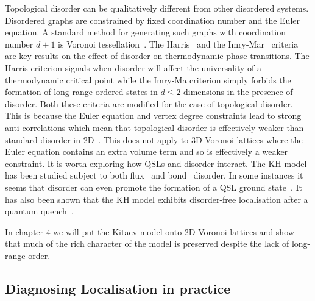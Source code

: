 Topological disorder can be qualitatively different from other disordered systems. Disordered graphs are constrained by fixed coordination number and the Euler equation. A standard method for generating such graphs with coordination number \(d+1\) is Voronoi tessellation~\autocite{mitchellAmorphousTopologicalInsulators2018,marsalTopologicalWeaireThorpeModels2020}. The Harris~\autocite{harrisEffectRandomDefects1974} and the Imry-Mar~\autocite{imryRandomFieldInstabilityOrdered1975} criteria are key results on the effect of disorder on thermodynamic phase transitions. The Harris criterion signals when disorder will affect the universality of a thermodynamic critical point while the Imry-Ma criterion simply forbids the formation of long-range ordered states in \(d \leq 2\) dimensions in the presence of disorder. Both these criteria are modified for the case of topological disorder. This is because the Euler equation and vertex degree constraints lead to strong anti-correlations which mean that topological disorder is effectively weaker than standard disorder in 2D~\autocite{barghathiPhaseTransitionsRandom2014,schrauthViolationHarrisBarghathiVojtaCriterion2018}. This does not apply to 3D Voronoi lattices where the Euler equation contains an extra volume term and so is effectively a weaker constraint. It is worth exploring how QSLs and disorder interact. The KH model has been studied subject to both flux~\autocite{Nasu_Thermal_2015} and bond~\autocite{knolle_dynamics_2016} disorder. In some instances it seems that disorder can even promote the formation of a QSL ground state~\autocite{wenDisorderedRouteCoulomb2017}. It has also been shown that the KH model exhibits disorder-free localisation after a quantum quench~\autocite{zhuSubdiffusiveDynamicsCritical2021}.

In chapter 4 we will put the Kitaev model onto 2D Voronoi lattices and show that much of the rich character of the model is preserved despite the lack of long-range order.

\hypertarget{diagnosing-localisation-in-practice}{%
\subsection{Diagnosing Localisation in practice}\label{diagnosing-localisation-in-practice}}

